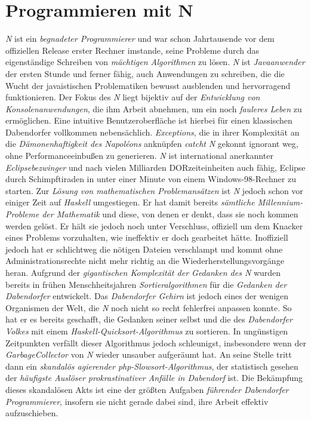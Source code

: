 \section{{Programmieren mit N}}
\textit{N} ist ein \textit{begnadeter Programmierer} und war schon Jahrtausende vor dem offiziellen Release erster Rechner imstande, seine Probleme durch das eigenständige Schreiben von \textit{mächtigen Algorithmen} zu lösen. \textit{N} ist \textit{Javaanwender} der ersten Stunde und ferner fähig, auch Anwendungen zu schreiben, die die Wucht der javaistischen Problematiken bewusst ausblenden und hervorragend funktionieren. Der Fokus des \textit{N} liegt bijektiv auf der \textit{Entwicklung von Konsolenanwendungen}, die ihm Arbeit abnehmen, um ein noch \textit{fauleres Leben} zu ermöglichen. Eine intuitive Benutzeroberfläche ist hierbei für einen klassischen Dabendorfer vollkommen nebensächlich. \textit{Exceptions}, die in ihrer Komplexität an die \textit{Dämonenhaftigkeit des Napoléons} anknüpfen \textit{catcht} \textit{N} gekonnt ignorant weg, ohne Performanceeinbußen zu generieren. \textit{N} ist international anerkannter \textit{Eclipsebezwinger} und nach vielen Milliarden DORzeiteinheiten auch fähig, Eclipse durch Schimpftiraden in unter einer Minute von einem Windows-98-Rechner zu starten. Zur \textit{Lösung von mathematischen Problemansätzen} ist \textit{N} jedoch schon vor einiger Zeit auf \textit{Haskell} umgestiegen. Er hat damit bereits \textit{sämtliche Millennium-Probleme der Mathematik} und diese, von denen er denkt, dass sie noch kommen werden gelöst. Er hält sie jedoch noch unter Verschluss, offiziell um dem Knacker eines Problems vorzuhalten, wie ineffektiv er doch gearbeitet hätte. Inoffiziell jedoch hat er schlichtweg die nötigen Dateien verschlampt und kommt ohne Administrationsrechte nicht mehr richtig an die Wiederherstellungsvorgänge heran. Aufgrund der \textit{gigantischen Komplexität der Gedanken des N} wurden bereits in frühen Menschheitsjahren \textit{Sortieralgorithmen} für die \textit{Gedanken der Dabendorfer} entwickelt. Das \textit{Dabendorfer Gehirn} ist jedoch eines der wenigen Organismen der Welt, die \textit{N} noch nicht so recht fehlerfrei anpassen konnte. So hat er es bereits geschafft, die Gedanken seiner selbst und die des \textit{Dabendorfer Volkes} mit einem \textit{Haskell-Quicksort-Algorithmus} zu sortieren. In ungünstigen Zeitpunkten verfällt dieser Algorithmus jedoch schleunigst, insbesondere wenn der \textit{GarbageCollector} von \textit{N} wieder unsauber aufgeräumt hat. An seine Stelle tritt dann ein \textit{skandalös agierender php-Slowsort-Algorithmus}, der statistisch gesehen der \textit{häufigste Auslöser prokrastinativer Anfälle in Dabendorf} ist. Die Bekämpfung dieses skandalösen Akts ist eine der größten Aufgaben \textit{führender Dabendorfer Programmierer}, insofern sie nicht gerade dabei sind, ihre Arbeit effektiv aufzuschieben.

